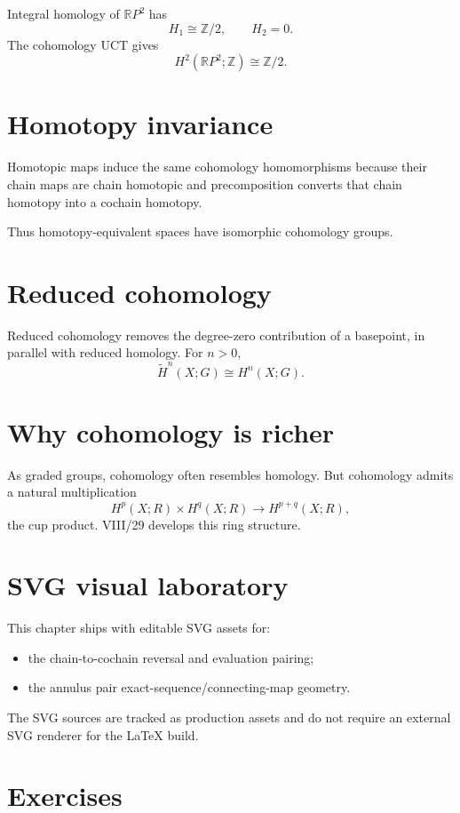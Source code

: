 Integral homology of \(\mathbb RP^2\) has
\[
H_1\cong\mathbb Z/2,
\qquad
H_2=0.
\]
The cohomology UCT gives
\[
H^2(\mathbb RP^2;\mathbb Z)\cong\mathbb Z/2.
\]

\section{Homotopy invariance}

Homotopic maps induce the same cohomology homomorphisms because their chain maps
are chain homotopic and precomposition converts that chain homotopy into a
cochain homotopy.

Thus homotopy-equivalent spaces have isomorphic cohomology groups.

\section{Reduced cohomology}

Reduced cohomology removes the degree-zero contribution of a basepoint, in
parallel with reduced homology.  For \(n>0\),
\[
\widetilde H^n(X;G)\cong H^n(X;G).
\]

\section{Why cohomology is richer}

As graded groups, cohomology often resembles homology.  But cohomology admits a
natural multiplication
\[
H^p(X;R)\times H^q(X;R)\to H^{p+q}(X;R),
\]
the cup product.  VIII/29 develops this ring structure.

\section{SVG visual laboratory}

This chapter ships with editable SVG assets for:
\begin{itemize}
\item the chain-to-cochain reversal and evaluation pairing;
\item the annulus pair exact-sequence/connecting-map geometry.
\end{itemize}

The SVG sources are tracked as production assets and do not require an external
SVG renderer for the LaTeX build.


\section{Exercises}


